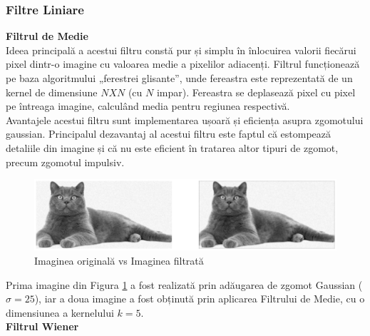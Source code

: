\documentclass[12pt]{article}
\begin{document}
\subsubsection{Filtre Liniare}
\textbf{Filtrul de Medie} \\
\indent Ideea principală a acestui filtru constă pur și simplu în înlocuirea valorii fiecărui pixel dintr-o imagine cu valoarea medie a pixelilor adiacenți. Filtrul funcționează pe baza algoritmului „ferestrei glisante”, unde fereastra este reprezentată de un kernel de dimensiune ${NXN}$ (cu ${N}$ impar). Fereastra se deplasează pixel cu pixel pe întreaga imagine, calculând media pentru regiunea respectivă. \\
\indent Avantajele acestui filtru sunt implementarea ușoară și eficiența asupra zgomotului gaussian.
Principalul dezavantaj al acestui filtru este faptul că estompează detaliile din imagine și că nu este eficient în tratarea altor tipuri de zgomot, precum zgomotul impulsiv.

\begin{figure}[h!]
    \centering
    \includegraphics[width=1\textwidth]{images/filtru_medie.eps}
    \caption{Imaginea originală vs Imaginea filtrată}
    \label{fig:img2}
\end{figure}

Prima imagine din Figura \ref{fig:img2} a fost realizată prin adăugarea de zgomot Gaussian (${\sigma=25}$), iar a doua imagine a fost obținută prin aplicarea Filtrului de Medie, cu o dimensiunea a kernelului ${k=5}$. \\[15pt]




\textbf{Filtrul Wiener} \\
\end{document}

